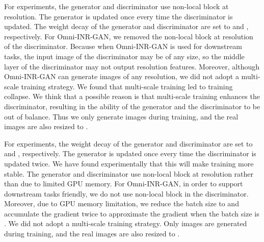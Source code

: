 \documentclass[paper_2425.tex]{subfiles}
\begin{document}
For  experiments, the generator and discriminator use non-local block at  resolution. The generator is updated once every time the discriminator is updated. The weight decay of the generator and discriminator are set to  and , respectively. For Omni-INR-GAN, we removed the non-local block at  resolution of the discriminator. Because when Omni-INR-GAN is used for downstream tasks, the input image of the discriminator may be of any size, so the middle layer of the discriminator may not output  resolution features. Moreover, although Omni-INR-GAN can generate images of any resolution, we did not adopt a multi-scale training strategy. We found that multi-scale training led to training collapse. We think that a possible reason is that multi-scale training enhances the discriminator, resulting in the ability of the generator and the discriminator to be out of balance. Thus we only generate  images during training, and the real images are also resized to .

For  experiments, the weight decay of the generator and discriminator are set to  and , respectively. The generator is updated once every time the discriminator is updated twice. We have found experimentally that this will make training more stable. The generator and discriminator use non-local block at  resolution rather than  due to limited GPU memory. For Omni-INR-GAN, in order to support downstream tasks friendly, we do not use non-local block in the discriminator. Moreover, due to GPU memory limitation, we reduce the batch size to  and accumulate the gradient twice to approximate the gradient when the batch size is . We did not adopt a multi-scale training strategy. Only  images are generated during training, and the real images are also resized to .
\end{document}
